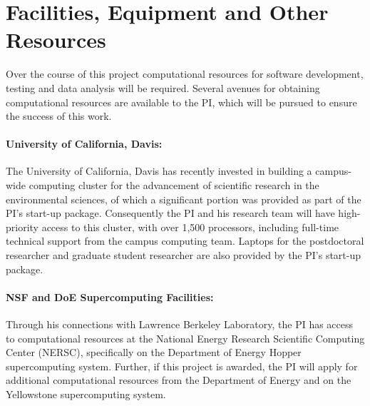 \documentclass[11pt]{article}
\begin{document}
\appendix

\setcounter{section}{8}

\section{Facilities, Equipment and Other Resources}

Over the course of this project computational resources for software development, testing and data analysis will be required.  Several avenues for obtaining computational resources are available to the PI, which will be pursued to ensure the success of this work.

\paragraph{University of California, Davis:} The University of California, Davis has recently invested in building a campus-wide computing cluster for the advancement of scientific research in the environmental sciences, of which a significant portion was provided as part of the PI's start-up package.  Consequently the PI and his research team will have high-priority access to this cluster, with over 1,500 processors, including full-time technical support from the campus computing team.  Laptops for the postdoctoral researcher and graduate student researcher are also provided by the PI's start-up package.

\paragraph{NSF and DoE Supercomputing Facilities:}  Through his connections with Lawrence Berkeley Laboratory, the PI has access to computational resources at the National Energy Research Scientific Computing Center (NERSC), specifically on the Department of Energy Hopper supercomputing system.  Further, if this project is awarded, the PI will apply for additional computational resources from the Department of Energy and on the Yellowstone supercomputing system.
\end{document}
